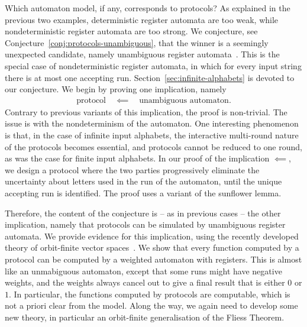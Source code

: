 Which automaton model, if any, corresponds to protocols? As explained in the previous two examples, deterministic register automata are too weak, while nondeterministic register automata are too strong.
We conjecture, see Conjecture~\ref{conj:protocols-unambiguous}, that the winner is a seemingly  unexpected candidate, namely unambiguous register automata~\cite[Section 5]{colcombet2015unambiguity}. This  is the special case of  nondeterministic register automata, in which  for every  input string there is  at most  one accepting run. 
Section~\ref{sec:infinite-alphabets} is devoted to our conjecture. We begin by proving one implication, namely 
\begin{align*}
\text{protocol} \quad \impliedby \quad \text{unambiguous automaton}.
\end{align*}
Contrary to  previous variants of this implication, the proof is non-trivial. The issue is with the nondeterminism of the automaton. One  interesting phenomenon is that, in the case of infinite input alphabets, the interactive multi-round nature of the protocols becomes essential, and protocols cannot be reduced to one round, as was the case for finite input alphabets. In our proof of the implication $\impliedby$, we design a protocol where  the two parties  progressively eliminate the uncertainty about letters used in the run of the automaton, until the unique accepting run is identified.
 The proof uses a variant of the sunflower lemma. 

Therefore,  the content of the conjecture is -- as in previous cases --  the other implication, namely that protocols can be simulated by unambiguous register automata. We provide evidence for this implication, using the recently developed theory of orbit-finite vector spaces~\cite{orbitFiniteVectorTheoretics}. We show that every function computed by a protocol can be computed by a weighted automaton with registers. This is almost like an unmabiguous automaton, except that some runs might have negative weights, and the weights always cancel out to give a final result that is either $0$ or $1$. In particular, the functions computed by protocols are computable, which is not a priori clear from the model. Along the way, we again need to develop some new theory, in particular an orbit-finite generalisation of the Fliess Theorem. 

